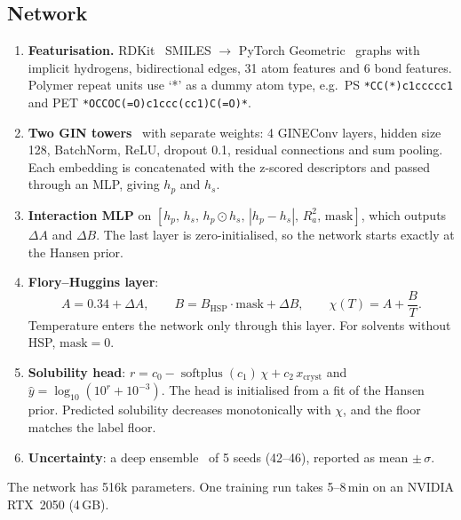 \documentclass[11pt,a4paper]{article}
\begin{document}
\subsection{Network}
\begin{enumerate}
\item \textbf{Featurisation.} RDKit~\cite{rdkit} SMILES $\rightarrow$ PyTorch Geometric~\cite{pyg}
graphs with implicit hydrogens, bidirectional edges, 31 atom features and 6 bond features. Polymer
repeat units use `*' as a dummy atom type, e.g.\ PS \texttt{*CC(*)c1ccccc1} and
PET \texttt{*OCCOC(=O)c1ccc(cc1)C(=O)*}.
\item \textbf{Two GIN towers}~\cite{gin,gine} with separate weights: 4 GINEConv layers, hidden size 128,
BatchNorm, ReLU, dropout 0.1, residual connections and sum pooling. Each embedding is concatenated with
the z-scored descriptors and passed through an MLP, giving $h_p$ and $h_s$.
\item \textbf{Interaction MLP} on $[h_p,\,h_s,\,h_p\odot h_s,\,|h_p-h_s|,\,R_a^2,\,\text{mask}]$, which
outputs $\Delta A$ and $\Delta B$. The last layer is zero-initialised, so the network starts exactly at
the Hansen prior.
\item \textbf{Flory--Huggins layer}:
\begin{equation}
A = 0.34 + \Delta A,\qquad B = B_{\mathrm{HSP}}\cdot\text{mask}+\Delta B,\qquad \chi(T)=A+\frac{B}{T}.
\end{equation}
Temperature enters the network only through this layer. For solvents without HSP, $\text{mask}=0$.
\item \textbf{Solubility head}:
$r=c_0-\operatorname{softplus}(c_1)\,\chi+c_2\,x_{\text{cryst}}$ and
$\hat y=\log_{10}\!\left(10^{r}+10^{-3}\right)$. The head is initialised from a fit of the Hansen prior.
Predicted solubility decreases monotonically with $\chi$, and the floor matches the label floor.
\item \textbf{Uncertainty}: a deep ensemble~\cite{ensemble} of 5 seeds (42--46), reported as mean
$\pm\,\sigma$.
\end{enumerate}
The network has 516k parameters. One training run takes 5--8\,min on an NVIDIA RTX~2050 (4\,GB).
\end{document}
